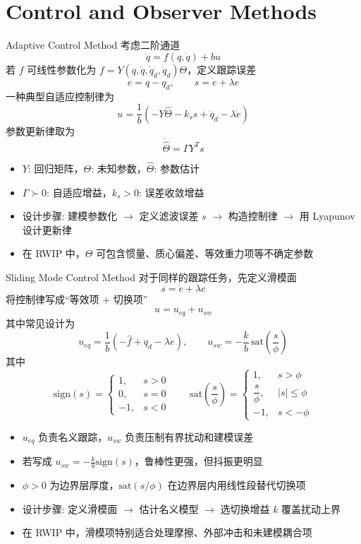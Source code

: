 \section{Control and Observer Methods}

\begin{frame}{Adaptive Control Method}
    \scriptsize
    考虑二阶通道
    \[
    \ddot q = f(q,\dot q) + b u
    \]
    若 $f$ 可线性参数化为 $f = Y(q,\dot q,\dot q_d,\ddot q_d)\Theta$，定义跟踪误差
    \[
    e=q-q_d,\qquad s=\dot e+\lambda e
    \]
    一种典型自适应控制律为
    \[
    u=\frac{1}{b}\left(-Y\hat\Theta-k_s s+\ddot q_d-\lambda \dot e\right)
    \]
    参数更新律取为
    \[
    \dot{\hat\Theta}=\Gamma Y^T s
    \]
    \begin{itemize}
        \setlength{\itemsep}{0.3em}
        \item $Y$: 回归矩阵，$\Theta$: 未知参数，$\hat\Theta$: 参数估计
        \item $\Gamma \succ 0$: 自适应增益，$k_s>0$: 误差收敛增益
        \item 设计步骤: 建模参数化 $\rightarrow$ 定义滤波误差 $s$ $\rightarrow$ 构造控制律 $\rightarrow$ 用 Lyapunov 设计更新律
        \item 在 RWIP 中，$\Theta$ 可包含惯量、质心偏差、等效重力项等不确定参数
    \end{itemize}
\end{frame}

\begin{frame}{Sliding Mode Control Method}
    \scriptsize
    对于同样的跟踪任务，先定义滑模面
    \[
    s=\dot e+\lambda e
    \]
    将控制律写成“等效项 + 切换项”
    \[
    u=u_{eq}+u_{sw}
    \]
    其中常见设计为
    \[
    u_{eq}=\frac{1}{b}\left(-\hat f+\ddot q_d-\lambda \dot e\right),\qquad
    u_{sw}=-\frac{k}{b}\,\mathrm{sat}\!\left(\frac{s}{\phi}\right)
    \]
    其中
    \[
    \mathrm{sign}(s)=
    \begin{cases}
    1, & s>0\\
    0, & s=0\\
    -1, & s<0
    \end{cases}
    \qquad
    \mathrm{sat}\!\left(\frac{s}{\phi}\right)=
    \begin{cases}
    1, & s>\phi\\
    \dfrac{s}{\phi}, & |s|\le \phi\\
    -1, & s<-\phi
    \end{cases}
    \]
    \begin{itemize}
        \setlength{\itemsep}{0.3em}
        \item $u_{eq}$ 负责名义跟踪，$u_{sw}$ 负责压制有界扰动和建模误差
        \item 若写成 $u_{sw}=-\frac{k}{b}\mathrm{sign}(s)$，鲁棒性更强，但抖振更明显
        \item $\phi>0$ 为边界层厚度，$\mathrm{sat}(s/\phi)$ 在边界层内用线性段替代切换项
        \item 设计步骤: 定义滑模面 $\rightarrow$ 估计名义模型 $\rightarrow$ 选切换增益 $k$ 覆盖扰动上界
        \item 在 RWIP 中，滑模项特别适合处理摩擦、外部冲击和未建模耦合项
    \end{itemize}
\end{frame}

